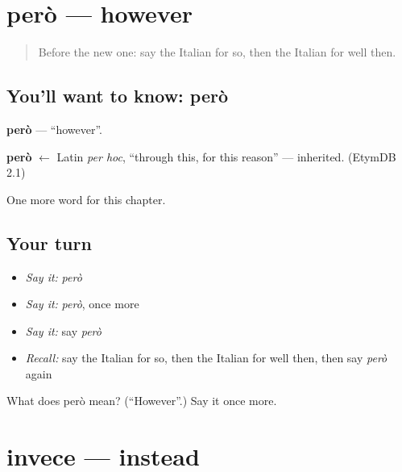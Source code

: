 \section[però]{però — however}

\label{lesson:IT-C155-pero}



\begin{quote}
Before the new one: say the Italian for so, then the Italian for well then.
\end{quote}

\subsection*{You'll want to know: però}
\textbf{però} — \textquotedblleft{}however\textquotedblright{}.

\begin{cousinweb}
\textbf{però} $\leftarrow$ Latin \emph{per hoc}, \textquotedblleft{}through this, for this reason\textquotedblright{} — inherited. (EtymDB 2.1)
\end{cousinweb}

\begin{grammarlens}[title={What you've built}]
One more word for this chapter.
\end{grammarlens}

\subsection*{Your turn}
\begin{itemize}
\raggedright
  \item \emph{Say it:} \emph{però}
  \item \emph{Say it:} \emph{però}, once more
  \item \emph{Say it:} say \emph{però}
  \item \emph{Recall:} say the Italian for so, then the Italian for well then, then say \emph{però} again
\end{itemize}

\begin{tcolorbox}[breakable,colback=teal!4,colframe=teal!35!black,title={Before you move on}]
What does però mean? (\textquotedblleft{}However\textquotedblright{}.) Say it once more.
\end{tcolorbox}
\section[invece]{invece — instead}

